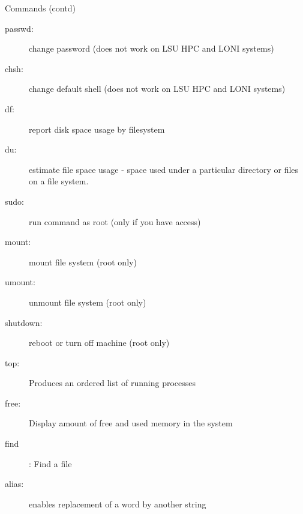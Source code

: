 \documentclass[slidestop,mathserif,compress,xcolor=svgnames]{beamer}
\begin{document}
\begin{frame}{\small Commands (contd)}
  \begin{description}
    \item[passwd:] change password (does not work on LSU HPC and LONI systems)
    \item[chsh:] change default shell (does not work on LSU HPC and LONI systems)
    \item[df:] report disk space usage by filesystem
    \item[du:] estimate file space usage - space used under a particular directory or files on a file system.
    \item[sudo:] run command as root (only if you have access)
    \item[mount:] mount file system (root only)
    \item[umount:] unmount file system (root only)
    \item[shutdown:] reboot or turn off machine (root only)
    \item[top:] Produces an ordered list of running processes
    \item[free:] Display amount of free and used memory in the system
    \item[find]: Find a file
    \item[alias:] enables replacement of a word by another string
  \end{description}
\end{frame}
\end{document}
